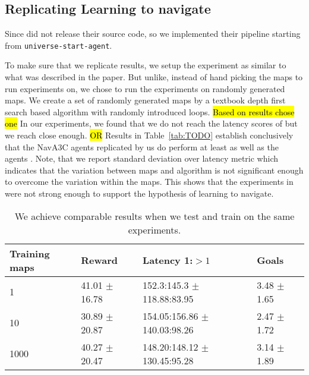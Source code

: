 %

\subsection{Replicating Learning to navigate}

Since \cite{MiPaViICLR2017} did not release their source code, so we implemented their pipeline starting from \texttt{universe-start-agent}\cite{OpenAI2017UniverseStarterAgent}.

To make sure that we replicate \cite{MiPaViICLR2017} results, we setup the experiment as similar to what was described in the paper.
But unlike, \cite{MiPaViICLR2017} instead of hand picking the maps to run experiments on, we chose to run the experiments on randomly generated maps.
We create a set of randomly generated maps by a textbook depth first search based algorithm with randomly introduced loops.
\hl{Based on results chose one}
In our experiments, we found that we do not reach the latency scores of \cite{MiPaViICLR2017} but we reach close enough.
\hl{OR}
Results in Table~\ref{tab:TODO} establish conclusively that the NavA3C agents replicated by us do perform at least as well as the agents .
Note, that we report standard deviation over latency metric which indicates that the variation between maps and algorithm is not significant enough to overcome the variation within the maps.
This shows that the experiments in \cite{MiPaViICLR2017} were not strong enough to support the hypothesis of learning to navigate.

\begin{table}[h]
    \label{sample-table}
    \begin{center}
        \begin{tabular}{llll}
          \toprule
          Training maps & Reward & Latency 1:$>1$ & Goals \\
          \midrule
          1 & 41.01 $\pm$  16.78 & 152.3:145.3 $\pm$ 118.88:83.95 & 3.48 $\pm$ 1.65 \\
          10 & 30.89 $\pm$  20.87 & 154.05:156.86 $\pm$ 140.03:98.26 & 2.47 $\pm$ 1.72 \\
          1000 & 40.27 $\pm$  20.47 & 148.20:148.12 $\pm$ 130.45:95.28 & 3.14 $\pm$ 1.89 \\
          \bottomrule
        \end{tabular}
    \end{center}
    \caption{We achieve comparable results when we test and train on the same experiments.}
\end{table}


